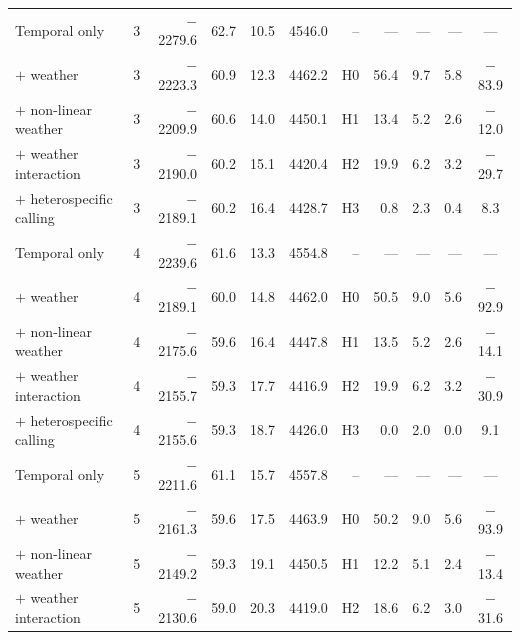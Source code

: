 \begin{table}[htbp]
\begin{tabular}{@{}l r rr r r rrr r c@{}}
\hspace{0.5em}Temporal only & 3 & $-$2279.6 & 62.7 & 10.5 & 4546.0 & -- & — & — & — & — \\
\hspace{0.5em}$+$ weather & 3 & $-$2223.3 & 60.9 & 12.3 & 4462.2 & H0 & 56.4 & 9.7 & 5.8 & $-$83.9 \\
\hspace{0.5em}$+$ non-linear weather & 3 & $-$2209.9 & 60.6 & 14.0 & 4450.1 & H1 & 13.4 & 5.2 & 2.6 & $-$12.0 \\
\hspace{0.5em}$+$ weather interaction & 3 & $-$2190.0 & 60.2 & 15.1 & 4420.4 & H2 & 19.9 & 6.2 & 3.2 & $-$29.7 \\
\hspace{0.5em}$+$ heterospecific calling & 3 & $-$2189.1 & 60.2 & 16.4 & 4428.7 & H3 & 0.8 & 2.3 & 0.4 & 8.3 \\
\hspace{0.5em}Temporal only & 4 & $-$2239.6 & 61.6 & 13.3 & 4554.8 & -- & — & — & — & — \\
\hspace{0.5em}$+$ weather & 4 & $-$2189.1 & 60.0 & 14.8 & 4462.0 & H0 & 50.5 & 9.0 & 5.6 & $-$92.9 \\
\hspace{0.5em}$+$ non-linear weather & 4 & $-$2175.6 & 59.6 & 16.4 & 4447.8 & H1 & 13.5 & 5.2 & 2.6 & $-$14.1 \\
\hspace{0.5em}$+$ weather interaction & 4 & $-$2155.7 & 59.3 & 17.7 & 4416.9 & H2 & 19.9 & 6.2 & 3.2 & $-$30.9 \\
\hspace{0.5em}$+$ heterospecific calling & 4 & $-$2155.6 & 59.3 & 18.7 & 4426.0 & H3 & 0.0 & 2.0 & 0.0 & 9.1 \\
\hspace{0.5em}Temporal only & 5 & $-$2211.6 & 61.1 & 15.7 & 4557.8 & -- & — & — & — & — \\
\hspace{0.5em}$+$ weather & 5 & $-$2161.3 & 59.6 & 17.5 & 4463.9 & H0 & 50.2 & 9.0 & 5.6 & $-$93.9 \\
\hspace{0.5em}$+$ non-linear weather & 5 & $-$2149.2 & 59.3 & 19.1 & 4450.5 & H1 & 12.2 & 5.1 & 2.4 & $-$13.4 \\
\hspace{0.5em}$+$ weather interaction & 5 & $-$2130.6 & 59.0 & 20.3 & 4419.0 & H2 & 18.6 & 6.2 & 3.0 & $-$31.6 \\

\end{tabular}
\end{table}
